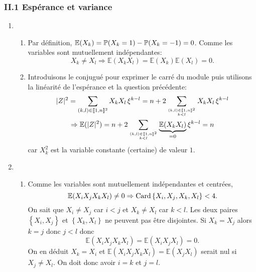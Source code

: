 \subsubsection*{II.1 Espérance et variance}

\begin{enumerate}
  \item
  \begin{enumerate}
    \item Par définition, $\mathbb{E}(X_k) = \mathbb{P}(X_k=1) - \mathbb{P}(X_k = -1) = 0$. Comme les variables sont mutuellement indépendantes:
\[
  X_k \neq X_l \Rightarrow  \mathbb{E}(X_k X_l) = \mathbb{E}(X_k) \mathbb{E}(X_l) = 0.
\]
    \item Introduisons le conjugué pour exprimer le carré du module puis utilisons la linéarité de l'espérance et la question précédente: 
\begin{multline*}
  |Z|^2 = \sum_{(k,l)\in \llbracket 1,n \rrbracket^2}X_kX_l\, \xi^{k-l} 
  = n + 2 \sum_{(k,l)\in \llbracket 1,n \rrbracket^2 \atop k < l}X_kX_l\, \xi^{k-l} \\
  \Rightarrow
  \mathbb{E}(|Z|^2) = n + 2\sum_{(k,l)\in \llbracket 1,n \rrbracket^2 \atop k < l} \underset{ = 0}{\underbrace{\mathbb{E}(X_k X_l)}}\, \xi^{k-l} 
   = n
\end{multline*}
car $X_k^2$ est la variable constante (certaine) de valeur $1$.
  \end{enumerate}

  \item
  \begin{enumerate}
    \item Comme les variables sont mutuellement indépendantes et centrées,
\[
  \mathbb{E}(X_i X_j X_k X_l) \neq 0 \Rightarrow  \operatorname{Card} \left\lbrace X_i, X_j, X_k, X_l \right\rbrace < 4 .
\]
On sait que $X_i \neq X_j$ car $i < j$ et $X_k \neq X_l$ car $k < l$. Les deux paires $\left \lbrace X_i, X_j\right\rbrace$ et $\left \lbrace X_k, X_l\right\rbrace$ ne peuvent pas être disjointes.\newline
Si $X_k = X_j$ alors $k = j$ donc $j < l$ donc 
\[
  \mathbb{E}(X_i X_j X_k X_l) = \mathbb{E}(X_i X_j X_l) = 0.
\]
On en déduit $X_k = X_i$ et $\mathbb{E}(X_i X_j X_k X_l) = \mathbb{E}(X_j X_l)$ serait nul si $X_j \neq X_l$. On doit donc avoir $i=k$ et $j=l$.


\end{enumerate}
\end{enumerate}
